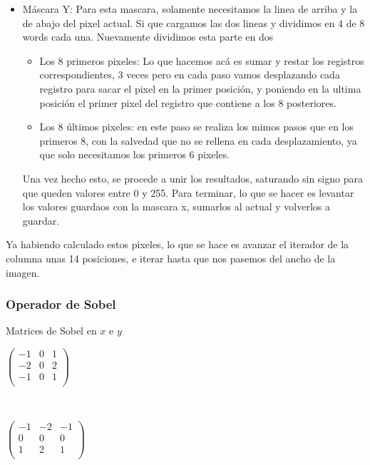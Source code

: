 \begin{itemize}
\item Máscara Y: Para esta mascara, solamente necesitamos la linea de arriba y la de abajo del pixel actual. Si que cargamos las dos lineas y dividimos en 4 de 8 words cada una. Nuevamente dividimos esta parte en dos
  \begin{itemize}
    \item Los 8 primeros pixeles: Lo que hacemos acá es sumar y restar los registros correspondientes, 3 veces pero en cada paso vamos desplazando cada registro para sacar el pixel en la primer posición, y poniendo en la ultima posición el primer pixel del registro que contiene a los 8 posteriores.
    \item Los 8 últimos pixeles: en este paso se realiza los mimos pasos que en los primeros 8, con la salvedad que no se rellena en cada desplazamiento, ya que solo necesitamos los primeros 6 pixeles.
  \end{itemize}
  Una vez hecho esto, se procede a unir los resultados, saturando sin signo para que queden valores entre 0 y 255. Para terminar, lo que se hacer es levantar los valores guardaos con la mascara x, sumarlos al actual y volverlos a guardar.
\end{itemize}
Ya habiendo calculado estos pixeles, lo que se hace es avanzar el iterador de la columna unas 14 posiciones, e iterar hasta que nos pasemos del ancho de la imagen.

\subsubsection{Operador de Sobel}

Matrices de Sobel en $x$ e $y$

\begin{center}
\begin{minipage}{0.30 \textwidth}
$\begin{pmatrix}
-1 & 0 & 1 \\
-2 & 0 & 2 \\
-1 & 0 & 1 \\
\end{pmatrix}$
\end{minipage}
\ \ 
 \begin{minipage}{0.30 \textwidth}
$\begin{pmatrix}
-1 & -2 & -1 \\
0 & 0 & 0  \\
1 & 2 & 1 \\
\end{pmatrix}$
\end{minipage}
\end{center}

